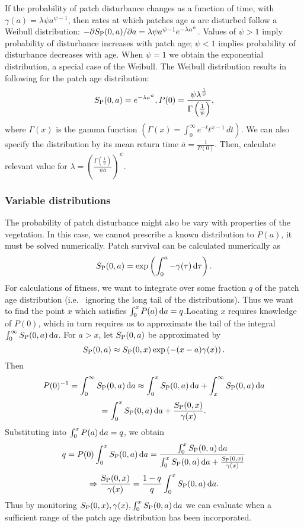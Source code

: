 \documentclass[10pt,twoside]{article}
\begin{document}
If the probability of patch disturbance changes as a function of time,
with \(\gamma(a) = \lambda \psi a^{\psi-1}\), then rates at which
patches age \(a\) are disturbed follow a Weibull distribution:
\(-\partial S_{\rm P}(0, a)/ \partial a = \lambda \psi a^{\psi -1}e^{-\lambda a^\psi}\).
Values of \(\psi>1\) imply probability of disturbance increases with
patch age; \(\psi<1\) implies probability of disturbance decreases with
age. When \(\psi = 1\) we obtain the exponential distribution, a special
case of the Weibull. The Weibull distribution results in following for
the patch age distribution:
\[S_{\rm P}(0, a) = e^{-\lambda a^\psi}, P(0) = \frac{\psi \lambda^{\frac1{\psi}}}{\Gamma\left(\frac1{\psi}\right)},\]
where \(\Gamma(x)\) is the gamma function
\(\left(\Gamma(x) = \int_{0}^{\infty}e^{-t}t^{x-1} \, dt\right)\). We can
also specify the distribution by its mean return time
\(\bar{a} = \frac1{P(0)}\). Then, calculate relevant value for
\(\lambda = \left(\frac{\Gamma\left(\frac1{\psi}\right)}{\psi \bar{a}}\right)^{\psi}\).

\subsubsection{Variable distributions}\label{variable-distributions}

The probability of patch disturbance might also be vary with properties
of the vegetation. In this case, we cannot prescribe a known
distribution to \(P(a)\), it must be solved numerically. Patch survival
can be calculated numerically as
\[S_{\rm P}(0, a) = \exp \left( \int_{0}^{a}-\gamma(\tau) \, {\rm d}\tau\right).\]
For calculations of fitness, we want to integrate over some fraction
\(q\) of the patch age distribution (i.e. ~ignoring the long tail of the
distributions). Thus we want to find the point \(x\) which satisfies
\(\int_{0}^{x} P(a) \, {\rm d}a = q\).Locating \(x\) requires knowledge of
\(P(0)\), which in turn requires us to approximate the tail of the
integral \(\int_{0}^{\infty} S_{\rm P}(0, a) \, {\rm d}a\). For \(a > x\), let
\(S_{\rm P}(0, a)\) be approximated by
\[S_{\rm P}(0, a) \approx S_{\rm P}(0, x) \exp\left( - (x-a) \gamma(x)\right).\] Then
\[P(0)^{-1} = \int_{0}^{\infty} S_{\rm P}(0, a) \, {\rm d}a \approx \int_{0}^{x} S_{\rm P}(0, a) \, {\rm d}a + \int_{x}^{\infty} S_{\rm P}(0, a) \, {\rm d}a\]
\[ = \int_{0}^{x} S_{\rm P}(0, a) \, {\rm d}a + \frac{S_{\rm P}(0, x)}{\gamma(x)}. \]
Substituting into \(\int_{0}^{x} P(a) \, {\rm d}a = q\), we obtain
\[q = P(0) \int_{0}^{x} S_{\rm P}(0, a) \, {\rm d}a = \frac{\int_{0}^{x} S_{\rm P}(0, a) \, {\rm d}a}{\int_{0}^{x} S_{\rm P}(0, a) \, {\rm d}a + \frac{S_{\rm P}(0, x)}{\gamma(x)}}\]
\[\Rightarrow  \frac{S_{\rm P}(0, x)}{\gamma(x)} = \frac{1-q}{q} \int_{0}^{x} S_{\rm P}(0, a) \, {\rm d}a.\]
Thus by monitoring
\(S_{\rm P}(0, x), \gamma(x), \int_{0}^{x} S_{\rm P}(0, a) \, {\rm d}a\) we can evaluate
when a sufficient range of the patch age distribution has been
incorporated.
\end{document}
